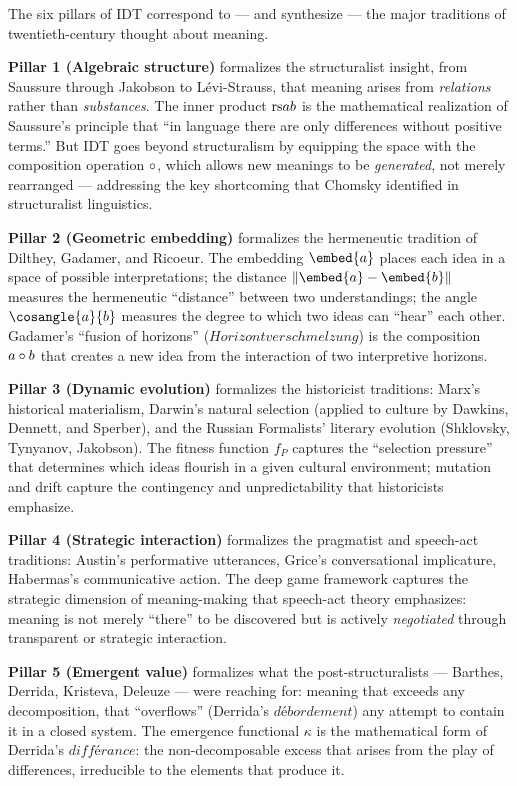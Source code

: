 \begin{interpretation}
\label{interp:ch22:synthesis_bakhtin_barthes_derrida}
The six pillars of IDT correspond to — and synthesize — the major
traditions of twentieth-century thought about meaning.

\textbf{Pillar 1 (Algebraic structure)} formalizes the structuralist
insight, from Saussure through Jakobson to Lévi-Strauss, that meaning
arises from \emph{relations} rather than \emph{substances}.  The inner
product $\mathrm{rs}{a}{b}$ is the mathematical realization of Saussure's
principle that ``in language there are only differences without positive
terms.''  But IDT goes beyond structuralism by equipping the space with
the composition operation $\circ$, which allows new meanings to be
\emph{generated}, not merely rearranged --- addressing the key
shortcoming that Chomsky identified in structuralist linguistics.

\textbf{Pillar 2 (Geometric embedding)} formalizes the hermeneutic
tradition of Dilthey, Gadamer, and Ricoeur.  The embedding $\embed{a}$
places each idea in a space of possible interpretations; the distance
$\|\embed{a} - \embed{b}\|$ measures the hermeneutic ``distance'' between
two understandings; the angle $\cosangle{a}{b}$ measures the degree to
which two ideas can ``hear'' each other.  Gadamer's ``fusion of
horizons'' ($Horizontverschmelzung$) is the composition $a \circ b$
that creates a new idea from the interaction of two interpretive horizons.

\textbf{Pillar 3 (Dynamic evolution)} formalizes the historicist traditions:
Marx's historical materialism, Darwin's natural selection (applied to
culture by Dawkins, Dennett, and Sperber), and the Russian Formalists'
literary evolution (Shklovsky, Tynyanov, Jakobson).  The fitness function
$f_P$ captures the ``selection pressure'' that determines which ideas
flourish in a given cultural environment; mutation and drift capture the
contingency and unpredictability that historicists emphasize.

\textbf{Pillar 4 (Strategic interaction)} formalizes the pragmatist and
speech-act traditions: Austin's performative utterances, Grice's
conversational implicature, Habermas's communicative action.  The deep
game framework captures the strategic dimension of meaning-making
that speech-act theory emphasizes: meaning is not merely ``there'' to
be discovered but is actively \emph{negotiated} through transparent or
strategic interaction.

\textbf{Pillar 5 (Emergent value)} formalizes what the post-structuralists
--- Barthes, Derrida, Kristeva, Deleuze --- were reaching for: meaning
that exceeds any decomposition, that ``overflows'' (Derrida's
$débordement$) any attempt to contain it in a closed system.  The
emergence functional $\kappa$ is the mathematical form of Derrida's
$différance$: the non-decomposable excess that arises from the play of
differences, irreducible to the elements that produce it.


\end{interpretation}
